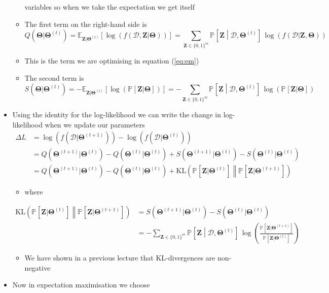 \documentclass[11pt]{article}
\newcommand{\av}[2][]{\mathbb{E}_{#1\!}\left[ #2 \right]}
\newcommand{\Prob}[2][]{\mathbb{P}_{#1\!}\left[ #2 \right]}
\newcommand{\logg}[1]{\log\!\left( #1 \right)}
\begin{document}
\begin{itemize}
\begin{itemize}
variables so when we take the expectation we get itself
\item The first term on the right-hand side is
$$ Q(\bm{\Theta}|\bm{\Theta}^{(t)}) =
        \av[\bm{Z}|\bm{\Theta}^{(t)}]{\logg{f(\mathcal{D},\bm{Z}|\bm{\Theta})}}
	=  \sum_{\bm{Z}\in\{0,1\}^m} \Prob{\bm{Z}\middle|\mathcal{D},\bm{\Theta}^{(t)}}\,
        \logg{f(\mathcal{D}|\bm{Z}, \bm{\Theta})} $$
\item This is the term we are optimising in equation (\ref{eq:em})
\item The second term is
$$ S(\bm{\Theta}|\bm{\Theta}^{(t)}) = - \av[\bm{Z}|\bm{\Theta}^{(t)}]{\logg{\Prob{\bm{Z}|\bm{\Theta}} }}
	=  - \sum_{\bm{Z}\in\{0,1\}^m} \Prob{\bm{Z}\middle|\mathcal{D},\bm{\Theta}^{(t)}}\,
        \logg{\Prob{\bm{Z}|\bm{\Theta}}} $$
\end{itemize}
\item Using the identity for the log-likelihood we can write the
change in log-likelihood when we update our
parameters 
\begin{align*}
\Delta L &=
\logg{f(\mathcal{D}|\bm{\Theta}^{(t+1)})} -
\logg{f(\mathcal{D}|\bm{\Theta}^{(t)})} \\
&= Q(\bm{\Theta}^{(t+1)}|\bm{\Theta}^{(t)}) -
Q(\bm{\Theta}^{(t)}|\bm{\Theta}^{(t)})
+ S(\bm{\Theta}^{(t+1)}|\bm{\Theta}^{(t)}) -
S(\bm{\Theta}^{(t)}|\bm{\Theta}^{(t)}) \\
&= Q(\bm{\Theta}^{(t+1)}|\bm{\Theta}^{(t)}) -
Q(\bm{\Theta}^{(t)}|\bm{\Theta}^{(t)})
+ \mathrm{KL}\!\left( \Prob{\bm{Z}|\bm{\Theta}^{(t)}} \middle\|
  \Prob{\bm{Z}|\bm{\Theta}^{(t+1)}} \right)
 \end{align*}
\begin{itemize}
\item where
\end{itemize}
\begin{align*}
\mathrm{KL}\!\left( \Prob{\bm{Z}|\bm{\Theta}^{(t)}} \middle\|
\Prob{\bm{Z}|\bm{\Theta}^{(t+1)}} \right) &=
S(\bm{\Theta}^{(t+1)}|\bm{\Theta}^{(t)}) -
S(\bm{\Theta}^{(t)}|\bm{\Theta}^{(t)}) \\
&= -  \sum_{\bm{Z}\in\{0,1\}^m} \Prob{\bm{Z}\middle|\mathcal{D},\bm{\Theta}^{(t)}}\,
\logg{\frac{ \Prob{\bm{Z}|\bm{\Theta}^{(t+1)}} }{ \Prob{\bm{Z}|\bm{\Theta}^{(t)}} }} 
\end{align*}
\begin{itemize}
\item We have shown in a previous lecture that KL-divergences are non-negative
\end{itemize}
\item Now in expectation maximisation we choose

\end{itemize}
\end{document}

